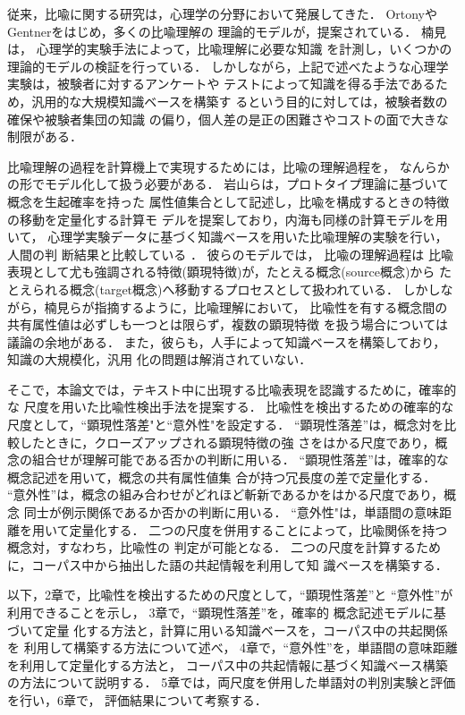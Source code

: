 従来，比喩に関する研究は，心理学の分野において発展してきた．
Ortony\cite{ortony79}やGentner\cite{gentner94}をはじめ，多くの比喩理解の
理論的モデルが，提案されている．
楠見\cite{Kusumi1996jb,Kusumi1996ja}は，
心理学的実験手法によって，比喩理解に必要な知識
を計測し，いくつかの理論的モデルの検証を行っている．
しかしながら，上記で述べたような心理学実験は，被験者に対するアンケートや
テストによって知識を得る手法であるため，汎用的な大規模知識ベースを構築す
るという目的に対しては，被験者数の確保や被験者集団の知識
の偏り，個人差の是正の困難さやコストの面で大きな制限がある．

比喩理解の過程を計算機上で実現するためには，比喩の理解過程を，
なんらかの形でモデル化して扱う必要がある．
岩山らは，プロトタイプ理論\cite{rosch75}に基づいて概念を生起確率を持った
属性値集合として記述し，比喩を構成するときの特徴の移動を定量化する計算モ
デルを提案しており\cite{Iwayama1991j}，内海も同様の計算モデルを用いて，
心理学実験データに基づく知識ベースを用いた比喩理解の実験を行い，人間の判
断結果と比較している
\cite{Utsumi1997j}．
彼らのモデルでは，
比喩の理解過程は
比喩表現として尤も強調される特徴(顕現特徴)が，たとえる概念(source概念)から
たとえられる概念(target概念)へ移動するプロセスとして扱われている．
しかしながら，楠見ら\cite{Kusumi1996ja,Iwayama1991j}が指摘するように，比喩理解において，
比喩性を有する概念間の共有属性値は必ずしも一つとは限らず，複数の顕現特徴
を扱う場合については議論の余地がある．
また，彼らも，人手によって知識ベースを構築しており，知識の大規模化，汎用
化の問題は解消されていない．

そこで，本論文では，テキスト中に出現する比喩表現を認識するために，確率的な
尺度を用いた比喩性検出手法を提案する．
比喩性を検出するための確率的な尺度として，``顕現性落差"と``意外性"を設定する．
``顕現性落差''は，概念対を比較したときに，クローズアップされる顕現特徴の強
さをはかる尺度であり，概念の組合せが理解可能である否かの判断に用いる．
``顕現性落差''は，確率的な
概念記述を用いて，概念の共有属性値集
合が持つ冗長度の差で定量化する．
``意外性''は，概念の組み合わせがどれほど斬新であるかをはかる尺度であり，概念
同士が例示関係であるか否かの判断に用いる．
``意外性"は，単語間の意味距離を用いて定量化する．
二つの尺度を併用することによって，比喩関係を持つ概念対，すなわち，比喩性の
判定が可能となる．
二つの尺度を計算するために，コーパス中から抽出した語の共起情報を利用して知
識ベースを構築する．

以下，2章で，比喩性を検出するための尺度として，``顕現性落差''と
``意外性''が利用できることを示し，
3章で，``顕現性落差''を，確率的
概念記述モデルに基づいて定量
化する方法と，計算に用いる知識ベースを，コーパス中の共起関係を
利用して構築する方法について述べ，
4章で，``意外性''を，単語間の意味距離を利用して定量化する方法と，
コーパス中の共起情報に基づく知識ベース構築の方法について説明する．
5章では，両尺度を併用した単語対の判別実験と評価を行い，6章で，
評価結果について考察する．

